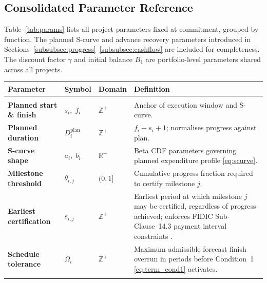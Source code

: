 \subsection{Consolidated Parameter Reference}
\label{subsec:parameters}

Table~\ref{tab:params} lists all project parameters fixed at commitment,
grouped by function. The planned S-curve and advance recovery parameters
introduced in Sections~\ref{subsubsec:progress}--\ref{subsubsec:cashflow}
are included for completeness. The discount factor $\gamma$ and initial
balance $B_1$ are portfolio-level parameters shared across all projects.

\begin{table}[htbp]
  \centering\small
  \renewcommand{\arraystretch}{1.3}
  \setlength{\tabcolsep}{6pt}
  \begin{tabular}{>{\bfseries}p{3.2cm} p{1.9cm} p{1.2cm} p{7.2cm}}
    \toprule
    \normalfont\textbf{Parameter} & \textbf{Symbol} &
    \textbf{Domain} & \textbf{Definition} \\
    \midrule
    \multicolumn{4}{l}{\textit{Schedule}} \\
    \midrule
    \rowcolor{RowAlt}
    Planned start \& finish
      & $s_i,\;f_i$ & $\mathbb{Z}^+$
      & Anchor of execution window and S-curve. \\
    Planned duration
      & $D_i^{\mathrm{plan}}$ & $\mathbb{Z}^+$
      & $f_i - s_i + 1$; normalises progress against plan. \\
    \rowcolor{RowAlt}
    S-curve shape
      & $a_i,\;b_i$ & $\mathbb{R}^+$
      & Beta CDF parameters governing planned expenditure profile
        \eqref{eq:scurve}. \\
    Milestone threshold
      & $\theta_{i,j}$ & $(0,1]$
      & Cumulative progress fraction required to certify milestone $j$. \\
    Earliest certification
      & $e_{i,j}$ & $\mathbb{Z}^+$
      & Earliest period at which milestone $j$ may be certified,
        regardless of progress achieved; enforces FIDIC Sub-Clause~14.3
        payment interval constraints \citep{FIDIC2017}. \\
    \rowcolor{RowAlt}
    Schedule tolerance
    & $\Omega_i$ & $\mathbb{Z}^+$
    & Maximum admissible forecast finish overrun in periods before
      Condition~1 \eqref{eq:term_cond1} activates. \\
  \rowcolor{RowAlt}

\end{tabular}
\end{table}
